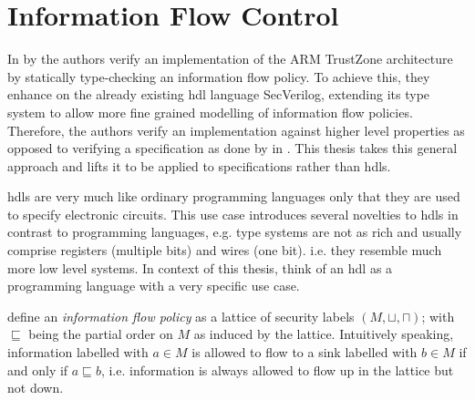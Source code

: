 \section{Information Flow Control}
\label{sec:bg-ifc}

In  \cite{Ferraiuolo17} by \citeauthor{Ferraiuolo17} the authors verify an implementation of the ARM TrustZone architecture by statically type-checking an information flow policy.
To achieve this, they enhance on the already existing \gls{hdl} language SecVerilog, extending its type system to allow more fine grained modelling of information flow policies.
Therefore, the authors verify an implementation against higher level properties as opposed to verifying a specification as done by \citeauthor{Reid17} in \cite{Reid17}.
This thesis takes this general approach and lifts it to be applied to specifications rather than \glspl{hdl}.

\glspl{hdl} are very much like ordinary programming languages only that they are used to specify electronic circuits.
This use case introduces several novelties to \glspl{hdl} in contrast to programming languages, e.g. type systems are not as rich and usually comprise registers (multiple bits) and wires (one bit). i.e. they resemble much more low level systems.
In context of this thesis, think of an \gls{hdl} as a programming language with a very specific use case.

\citeauthor{Ferraiuolo17} define an \textit{information flow policy} as a lattice of security labels $ (M, \sqcup, \sqcap) $; with $ \sqsubseteq $ being the partial order on $ M $ as induced by the lattice.
Intuitively speaking, information labelled with $ a \in M $ is allowed to flow to a sink labelled with $ b \in M $ if and only if $ a \sqsubseteq b $, i.e. information is always allowed to flow up in the lattice but not down.

